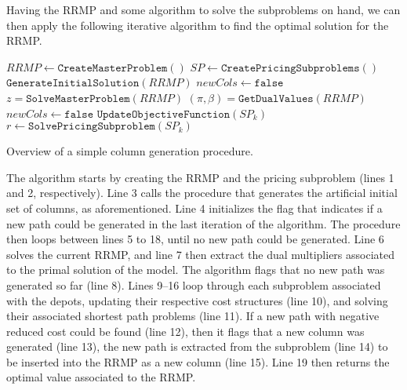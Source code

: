 \documentclass{article}
\begin{document}
\vspace{12pt}

Having the RRMP and some algorithm to solve the subproblems on hand, we can then apply the following iterative algorithm to find the optimal solution for the RRMP.

\begin{algorithm}
   $\mathit{RRMP} \gets \mathtt{CreateMasterProblem()}$\;
   $\mathit{SP} \gets \mathtt{CreatePricingSubproblems}()$\;
   $\mathtt{GenerateInitialSolution}(\mathit{RRMP})$\;
   $\mathit{newCols} \gets \mathtt{false}$\;
    {
      $z = \mathtt{SolveMasterProblem}(\mathit{RRMP})$\;
      $(\pi, \beta) = \mathtt{GetDualValues}(\mathit{RRMP})$\;
      $\mathit{newCols} \gets \mathtt{false}$\;
      \BlankLine
       {
         $\mathtt{UpdateObjectiveFunction}(\mathit{SP}_k)$\;
         $r \gets \mathtt{SolvePricingSubproblem}(\mathit{SP}_k)$\;
         \BlankLine
      }
   }
   \caption{Overview of a simple column generation procedure.}
\end{algorithm}

The algorithm starts by creating the RRMP and the pricing subproblem (lines 1 and 2, respectively). Line 3 calls the procedure that generates the artificial initial set of columns, as aforementioned. Line 4 initializes the flag that indicates if a new path could be generated in the last iteration of the algorithm. The procedure then loops between lines 5 to 18, until no new path could be generated. Line 6 solves the current RRMP, and line 7 then extract the dual multipliers associated to the primal solution of the model. The algorithm flags that no new path was generated so far (line 8). Lines 9--16 loop through each subproblem associated with the depots, updating their respective cost structures (line 10), and solving their associated shortest path problems (line 11). If a new path with negative reduced cost could be found (line 12), then it flags that a new column was generated (line 13), the new path is extracted from the subproblem (line 14) to be inserted into the RRMP as a new column (line 15). Line 19 then returns the optimal value associated to the RRMP.
\end{document}
